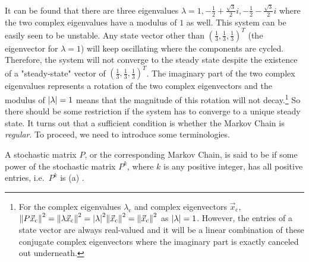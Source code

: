 It can be found that there are three eigenvalues $\lambda = 1, -\frac{1}{2} + \frac{\sqrt{3}}{2}i, -\frac{1}{2} - \frac{\sqrt{3}}{2}i$ where the two complex eigenvalues have a modulus of $1$ as well. This system can be easily seen to be unstable. Any state vector other than $(\frac{1}{3}, \frac{1}{3}, \frac{1}{3})^T$ (the eigenvector for $\lambda = 1$) will keep oscillating where the components are cycled. Therefore, the system will not converge to the steady state despite the existence of a "steady-state" vector of $(\frac{1}{3}, \frac{1}{3}, \frac{1}{3})^T$. The imaginary part of the two complex eigenvalues represents a rotation of the two complex eigenvectors and the modulus of $\abs{\lambda} = 1$ means that the magnitude of this rotation will not decay.\footnote{For the complex eigenvalues $\lambda_{\text{c}}$ and complex eigenvectors $\vec{x}_{\text{c}}$, $\norm{P\vec{x}_{\text{c}}}^2 = \norm{\lambda\vec{x}_{\text{c}}}^2 = \abs{\lambda}^2 \norm{\vec{x}_{\text{c}}}^2 = \norm{\vec{x}_{\text{c}}}^2$ as $\abs{\lambda} = 1$. However, the entries of a state vector are always real-valued and it will be a linear combination of these conjugate complex eigenvectors where the imaginary part is exactly canceled out underneath.} So there should be some restriction if the system has to converge to a unique steady state. It turns out that a sufficient condition is whether the Markov Chain is \textit{regular}. To proceed, we need to introduce some terminologies.

\begin{defn}
\label{defn:regularstoc}
A stochastic matrix $P$, or the corresponding Markov Chain, is said to be  if some power of the stochastic matrix $P^k$, where $k$ is any positive integer, has all positive entries, i.e.\ $P^k$ is (a) .
\end{defn}

